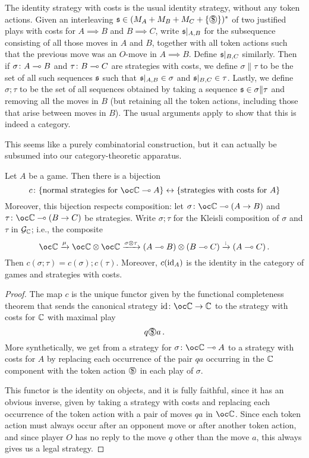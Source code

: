\documentclass{article}
\begin{document}
The identity strategy with costs is the usual identity strategy, without any token actions.  
Given an interleaving $\s\in(M_A+M_B+M_C+\{\slot\})^*$ of two justified plays with costs for $A \implies B$ and $B\implies C$, write $\mathfrak s\vert_{A,B}$ for the subsequence consisting of all those moves in $A$ and $B$, together with all token actions such that the previous move was an $O$-move in $A\implies B$.  
Define $\mathfrak s\vert_{B,C}$ similarly.  
Then if $\sigma\colon A \multimap B$ and $\tau\colon B \multimap C$ are strategies with costs, we define $\sigma\|\tau$ to be the set of all such sequences $\mathfrak s$ such that $\mathfrak s\vert_{A,B}\in\sigma$ and $\mathfrak s\vert_{B,C}\in\tau$.  
Lastly, we define $\sigma;\tau$ to be the set of all sequences obtained by taking a sequence $\mathfrak s\in\sigma\|\tau$ and removing all the moves in $B$ (but retaining all the token actions, including those that arise between moves in $B$).  
The usual arguments apply to show that this is indeed a category.

This seems like a purely combinatorial construction, but it can actually be subsumed into our category-theoretic apparatus.

\begin{proposition}
  Let $A$ be a game.  
  Then there is a bijection
  \[
    c \from \{\text{normal strategies for $\oc\bC \implies A$}\}\leftrightarrow\{\text{strategies with costs for $A$}\}
    \]
  Moreover, this bijection respects composition: let $\sigma \from\oc\bC \implies (A \to B)$ and $\tau \from \oc\bC \implies (B \to C)$ be strategies.  
  Write $\sigma;\tau$ for the Kleisli composition of $\sigma$ and $\tau$ in $\mathcal G_{\mathbb{C}}$; i.e., the composite
  \[
    \oc\bC \xrightarrow{\mu}
    \oc\bC \tensor \oc\bC \xrightarrow{\sigma\tensor\tau}
    (A \implies B) \tensor (B \implies C) \xrightarrow{;}
    (A \implies C)\,.
    \]
  Then $c(\sigma;\tau)=c(\sigma);c(\tau)$.  
  Moreover, $c(\operatorname{id}_A)$ is the identity in the category of games and strategies with costs.
\end{proposition}
\begin{proof}
  The map $c$ is the unique functor given by the functional completeness theorem that sends the canonical strategy $\id \from \oc\bC \to \bC$ to the strategy with costs for $\mathbb{C}$ with maximal play
  \[
    q\slot a\,.
    \]
  More synthetically, we get from a strategy for $\sigma\from\oc \bC \implies A$ to a strategy with costs for $A$ by replacing each occurrence of the pair $qa$ occurring in the $\mathbb{C}$ component with the token action $\slot$ in each play of $\sigma$.

  This functor is the identity on objects, and it is fully faithful, since it has an obvious inverse, given by taking a strategy with costs and replacing each occurrence of the token action with a pair of moves $qa$ in $\oc\bC$.
  Since each token action must always occur after an opponent move or after another token action, and since player $O$ has no reply to the move $q$ other than the move $a$, this always gives us a legal strategy.
\end{proof}
\end{document}
